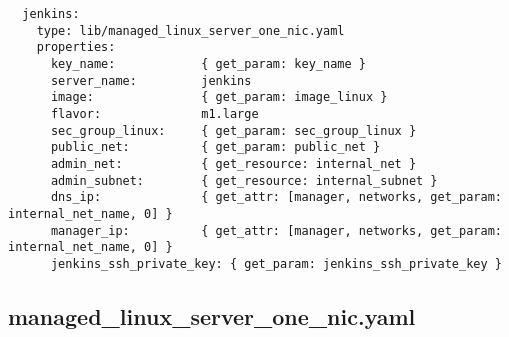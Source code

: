 \begin{verbatim}
  jenkins:
    type: lib/managed_linux_server_one_nic.yaml
    properties:
      key_name:            { get_param: key_name }
      server_name:         jenkins
      image:               { get_param: image_linux }
      flavor:              m1.large
      sec_group_linux:     { get_param: sec_group_linux }  
      public_net:          { get_param: public_net }  
      admin_net:           { get_resource: internal_net }
      admin_subnet:        { get_resource: internal_subnet }
      dns_ip:              { get_attr: [manager, networks, get_param: internal_net_name, 0] }
      manager_ip:          { get_attr: [manager, networks, get_param: internal_net_name, 0] }
      jenkins_ssh_private_key: { get_param: jenkins_ssh_private_key }
\end{verbatim}

\subsection{managed\_linux\_server\_one\_nic.yaml}

